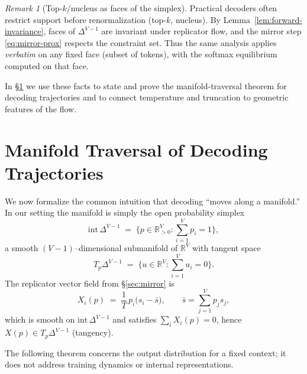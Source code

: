 \documentclass[11pt,reqno]{article}
\numberwithin{equation}{section}
\theoremstyle{plain}
\theoremstyle{definition}
\theoremstyle{remark}
\newtheorem{remark}[theorem]{Remark}
\newcommand{\R}{\mathbb{R}}
\newcommand{\1}{\mathbbm{1}}
\newcommand{\simplex}{\Delta^{V-1}}
\newcommand{\avgscore}{\bar{s}}
\begin{document}
\begin{remark}[Top-$k$/nucleus as faces of the simplex]
Practical decoders often restrict support before renormalization (top-$k$, nucleus). By Lemma~\ref{lem:forward-invariance}, faces of $\simplex$ are invariant under replicator flow, and the mirror step \eqref{eq:mirror-prox} respects the constraint set. Thus the same analysis applies \emph{verbatim} on any fixed face (subset of tokens), with the softmax equilibrium computed on that face.
\end{remark}

\medskip
In \S\ref{sec:manifold} we use these facts to state and prove the manifold-traversal theorem for decoding trajectories and to connect temperature and truncation to geometric features of the flow.


\section{Manifold Traversal of Decoding Trajectories}\label{sec:manifold}

We now formalize the common intuition that decoding ``moves along a manifold.'' In our setting the manifold is simply the open probability simplex
\[
\mathrm{int}\,\simplex \;=\; \Big\{p\in\R^V_{>0} : \sum_{i=1}^V p_i = 1\Big\},
\]
a smooth $(V-1)$–dimensional submanifold of $\R^V$ with tangent space
\[
T_p\simplex \;=\; \Big\{ u\in\R^V : \sum_{i=1}^V u_i = 0 \Big\}.
\]
The replicator vector field from \S\ref{sec:mirror} is
\begin{equation}\label{eq:repvf}
X_i(p)\;=\;\frac{1}{T}\,p_i\big(s_i-\avgscore\big),\qquad \avgscore=\sum_{j=1}^V p_j s_j,
\end{equation}
which is smooth on $\mathrm{int}\,\simplex$ and satisfies $\sum_i X_i(p)=0$, hence $X(p)\in T_p\simplex$ (tangency).

The following theorem concerns the output distribution for a fixed context; it does not address training dynamics or internal representations.
\end{document}
